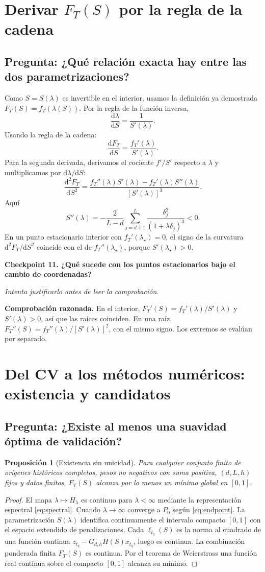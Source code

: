 \documentclass[11pt,letterpaper,parskip=half,headings=small]{scrartcl}
\newtheorem{proposicion}{Proposición}[section]
\theoremstyle{definition}\newtheorem{definicion}[proposicion]{Definición}
\theoremstyle{remark}\newtheorem{observacion}[proposicion]{Observación}
\newcommand{\dt}{\mathrm d}\newcommand{\Q}{Q_d}
\newcommand{\pregunta}[1]{\subsection{Pregunta: #1}}
\newcommand{\checkpoint}[3]{%
  \par\medskip\noindent\textbf{\color{blue!45!black}Checkpoint #1. #2}\par
  \noindent\emph{Intenta justificarlo antes de leer la comprobación.}\par
  \noindent\textbf{Comprobación razonada. }#3\par\bigskip
}
\begin{document}
\section{Derivar $F_T(S)$ por la regla de la cadena}
\pregunta{¿Qué relación exacta hay entre las dos parametrizaciones?}
Como $S=S(\lambda)$ es invertible en el interior, usamos la definición ya demostrada $F_T(S)=f_T(\lambda(S))$. Por la regla de la función inversa,
\[
\frac{\dt\lambda}{\dt S}=\frac1{S'(\lambda)}.
\]
Usando la regla de la cadena:
\begin{equation}\label{eq:dFdS}
\boxed{\frac{\dt F_T}{\dt S}=
\frac{f_T'(\lambda)}{S'(\lambda)}.}
\end{equation}
Para la segunda derivada, derivamos el cociente $f'/S'$ respecto a $\lambda$ y multiplicamos por $\dt\lambda/\dt S$:
\begin{equation}\label{eq:d2FdS2}
\boxed{\frac{\dt^2 F_T}{\dt S^2}
=\frac{f_T''(\lambda)S'(\lambda)-f_T'(\lambda)S''(\lambda)}{[S'(\lambda)]^3}.}
\end{equation}
Aquí
\begin{equation}\label{eq:Ssecond}
S''(\lambda)=-\frac2{L-d}\sum_{j=d+1}^L
\frac{\delta_j^2}{(1+\lambda\delta_j)^3}<0.
\end{equation}
En un punto estacionario interior con $f_T'(\lambda_\star)=0$, el signo de la curvatura $\dt^2F_T/\dt S^2$ coincide con el de $f_T''(\lambda_\star)$, porque $S'(\lambda_\star)>0$.

\checkpoint{11}{¿Qué sucede con los puntos estacionarios bajo el cambio de coordenadas?}{En el interior, $F_T'(S)=f_T'(\lambda)/S'(\lambda)$ y $S'(\lambda)>0$, así que las raíces coinciden. En una raíz, $F_T''(S)=f_T''(\lambda)/[S'(\lambda)]^2$, con el mismo signo. Los extremos se evalúan por separado.}

\section{Del CV a los métodos numéricos: existencia y candidatos}
\pregunta{¿Existe al menos una suavidad óptima de validación?}
\begin{proposicion}[Existencia sin unicidad]\label{prop:exist}
Para cualquier conjunto finito de orígenes históricos completos, pesos no negativos con suma positiva, $(d,L,h)$ fijos y datos finitos, $F_T(S)$ alcanza por lo menos un mínimo global en $[0,1]$.
\end{proposicion}
\begin{proof}
El mapa $\lambda\mapsto H_\lambda$ es continuo para $\lambda<\infty$ mediante la representación espectral \eqref{eq:spectral}. Cuando $\lambda\to\infty$ converge a $P_0$ según \eqref{eq:endpoint}. La parametrización $S(\lambda)$ identifica continuamente el intervalo compacto $[0,1]$ con el espacio extendido de penalizaciones. Cada $\ell_{t_q}(S)$ es la norma al cuadrado de una función continua $z_{t_q}-G_{d,h}H(S)x_{t_q}$, luego es continua. La combinación ponderada finita $F_T(S)$ es continua. Por el teorema de Weierstrass una función real continua sobre el compacto $[0,1]$ alcanza su mínimo.
\end{proof}
\end{document}
